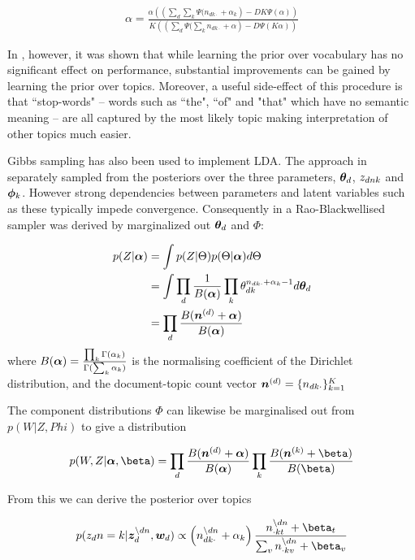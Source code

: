 \begin{align}
\alpha = \frac{\alpha \left( \left(\sum_d \sum_k \Psi(n_{dk\cdot} + \alpha_k \right) - DK \Psi (\alpha)\right)}{K \left( \left(\sum_d  \Psi(\sum_k n_{dk\cdot} + \alpha \right) - D \Psi (K \alpha)\right)}
\end{align}

In \cite{Wallach2009a}, however, it was shown that while learning the prior over vocabulary has no significant effect on performance, substantial improvements can be gained by learning the prior over topics. Moreover, a useful side-effect of this procedure is that ``stop-words" -- words such as ``the", ``of" and "that" which have no semantic meaning -- are all captured by the most likely topic making interpretation of other topics much easier.

Gibbs sampling has also been used to implement LDA. The approach in  \cite{Pritchard2000} separately sampled from the posteriors over the three parameters, ${ \bm \theta_d }$, ${ z_{dnk} }$ and ${ \bm \phi_k }$. However strong dependencies between parameters and latent variables such as these typically impede convergence\cite{CasellaRobert1999}. Consequently in \cite{Griffiths2004} a Rao-Blackwellised sampler was derived by marginalized out ${ \bm \theta_d }$ and $\Phi$:

\begin{align}
p(Z|\bm \alpha) & = \int p(Z|\Theta)p(\Theta|\bm \alpha) d\Theta \\
& = \int \prod_d \frac{1}{ {B(\bm \alpha)} } \prod_k \theta_{dk}^{n_{dk\cdot} + \alpha_k - 1} d{ \bm \theta_d } \\
& = \prod_d \frac{B(\bm n^{(d)} + \bm \alpha)}{B(\bm \alpha)}
\end{align}
where $B(\bm \alpha) = \frac{\prod_k \Gamma(\alpha_k)}{\Gamma(\sum_k \alpha_k)}$ is the normalising coefficient of the Dirichlet distribution, and the document-topic count vector $\bm n^{(d)} = \{ n_{dk\cdot} \}_{k=1}^K$

The component distributions $\Phi$ can likewise be marginalised out from $p(W|Z,Phi)$ to give a distribution

\begin{align}
p(W,Z|\vv{\alpha},\vv{\beta}) = \prod_d \frac{B(\vv{n}^{(d)} + \vv{\alpha})}{B(\vv{\alpha})} \prod_k \frac{B(\vv{n}^{(k)} + \vv{\beta})}{B(\vv{\beta})}
\end{align}

From this we can derive the posterior over topics

\begin{align}
p(z_dn = k | \vv{z}_{d}^{\setminus dn}, \vv{w}_d)
\propto
\left(n_{dk\cdot}^{\setminus dn} + \alpha_k \right)
\frac{n_{\cdot kt}^{\setminus dn} + \beta_t}{\sum_v n_{\cdot kv}^{\setminus dn} + \beta_v}
\end{align}

